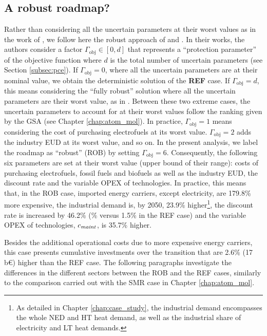 \subsection{A robust roadmap?}
\label{subsec:RobPol:Rob_roadmap}
Rather than considering all the uncertain parameters at their worst values as in the work of \citet{soyster1973convex}, we follow here the robust approach of \citet{bertsimas2004price} and \citet{Moret2017PhDThesis}. In their works, the authors consider a factor $\Gamma_{\text{obj}}\in [0,d]$ that represents a ``protection parameter'' of the objective function where $d$ is the total number of uncertain parameters (see Section \ref{subsec:pce}). If $\Gamma_{\text{obj}}= 0$, where all the uncertain parameters are at their nominal value, we obtain the deterministic solution of the \textbf{REF} case. If $\Gamma_{\text{obj}}= d$, this means considering the ``fully robust'' solution where all the uncertain parameters are their worst value, as in \citet{soyster1973convex}.  Between these two extreme cases, the uncertain parameters to account for at their worst values follow the ranking given by the \gls{GSA} (see Chapter \ref{chap:atom_mol}). In practice, $\Gamma_{\text{obj}}= 1$ means considering the cost of purchasing electrofuels at its worst value. $\Gamma_{\text{obj}}= 2$ adds the industry \gls{EUD} at its worst value, and so on. In the present analysis, we label the roadmap as ``robust'' (ROB) by setting $\Gamma_{\text{obj}}= 6$. Consequently, the following six parameters are set at their worst value (upper bound of their range): costs of purchasing electrofuels, fossil fuels and biofuels as well as the industry \gls{EUD}, the discount rate and the variable OPEX of technologies. In practice, this means that, in the ROB case, imported energy carriers, except electricity, are 179.8\% more expensive, the industrial demand is, by 2050, 23.9\% higher\footnote{As detailed in Chapter \ref{chap:case_study}, the industrial demand encompasses the whole \gls{NED} and \gls{HT} heat demand, as well as the industrial share of electricity and \gls{LT} heat demands.}, the discount rate is increased by 46.2\% (\% versus 1.5\% in the REF case) and the variable OPEX of technologies, $c_{\text{\emph{maint}}}$, is 35.7\% higher. 

Besides the additional operational costs due to more expensive energy carriers, this case presents cumulative investments over the transition that are 2.6\% (17\,b€) higher than the REF case. The following paragraphs investigate the differences in the different sectors between the ROB and the REF cases, similarly to the comparison carried out with the SMR case in Chapter \ref{chap:atom_mol}.\\

